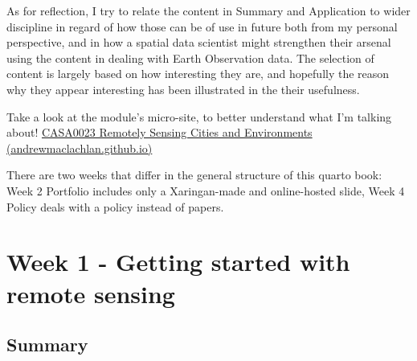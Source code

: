 \documentclass[
  letterpaper,
  DIV=11,
  numbers=noendperiod]{scrreprt}
\begin{document}
As for reflection, I try to relate the content in Summary and
Application to wider discipline in regard of how those can be of use in
future both from my personal perspective, and in how a spatial data
scientist might strengthen their arsenal using the content in dealing
with Earth Observation data. The selection of content is largely based
on how interesting they are, and hopefully the reason why they appear
interesting has been illustrated in the their usefulness.

Take a look at the module's micro-site, to better understand what I'm
talking about!
\href{https://andrewmaclachlan.github.io/CASA0023/}{CASA0023 Remotely
Sensing Cities and Environments (andrewmaclachlan.github.io)}

There are two weeks that differ in the general structure of this quarto
book: Week 2 Portfolio includes only a Xaringan-made and online-hosted
slide, Week 4 Policy deals with a policy instead of papers.


\hypertarget{week-1---getting-started-with-remote-sensing}{%
\chapter{Week 1 - Getting started with remote
sensing}\label{week-1---getting-started-with-remote-sensing}}

\hypertarget{summary}{%
\section{Summary}\label{summary}}
\end{document}
